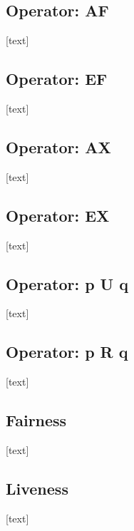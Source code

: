 \documentclass{article}
\begin{document}
		\subsection{Operator: AF}
				
		[text]
		
		\subsection{Operator: EF}
				
		[text]
		
		\subsection{Operator: AX}
				
		[text]
		
		\subsection{Operator: EX}
				
		[text]
		
		\subsection{Operator: p U q}
				
		[text]
		
		\subsection{Operator: p R q}
				
		[text]
		
		\subsection{Fairness}
				
		[text]
		
		\subsection{Liveness}
			
		[text]
		
	
	\newpage
	
	
	
	
	
\end{document}
